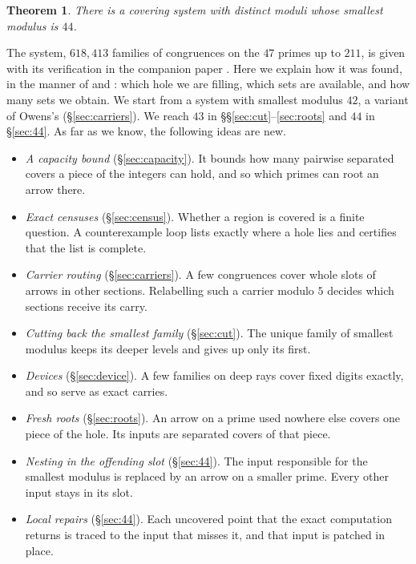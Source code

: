 \documentclass[11pt]{amsart}
\newtheorem{theorem}{Theorem}[section]
\theoremstyle{definition}
\theoremstyle{remark}
\begin{document}
\begin{theorem}\label{thm:44}
There is a covering system with distinct moduli whose smallest modulus is $44$.
\end{theorem}

The system, $618{,}413$ families of congruences on the $47$ primes up to $211$, is given with its verification in the
companion paper \cite{Companion}. Here we explain how it was found, in the manner of \cite{Nielsen09} and
\cite{Owens14}: which hole we are filling, which sets are available, and how many sets we obtain. We start from a
system with smallest modulus $42$, a variant of Owens's (§\ref{sec:carriers}). We reach $43$ in
§§\ref{sec:cut}--\ref{sec:roots} and $44$ in §\ref{sec:44}. As far as we know, the following ideas are new.
\begin{itemize}
\item \emph{A capacity bound} (§\ref{sec:capacity}). It bounds how many pairwise separated covers a piece of the
  integers can hold, and so which primes can root an arrow there.
\item \emph{Exact censuses} (§\ref{sec:census}). Whether a region is covered is a finite question. A counterexample
  loop lists exactly where a hole lies and certifies that the list is complete.
\item \emph{Carrier routing} (§\ref{sec:carriers}). A few congruences cover whole slots of arrows in other sections.
  Relabelling such a carrier modulo $5$ decides which sections receive its carry.
\item \emph{Cutting back the smallest family} (§\ref{sec:cut}). The unique family of smallest modulus keeps its deeper
  levels and gives up only its first.
\item \emph{Devices} (§\ref{sec:device}). A few families on deep rays cover fixed digits exactly, and so serve as
  exact carries.
\item \emph{Fresh roots} (§\ref{sec:roots}). An arrow on a prime used nowhere else covers one piece of the hole.
  Its inputs are separated covers of that piece.
\item \emph{Nesting in the offending slot} (§\ref{sec:44}). The input responsible for the smallest modulus is
  replaced by an arrow on a smaller prime. Every other input stays in its slot.
\item \emph{Local repairs} (§\ref{sec:44}). Each uncovered point that the exact computation returns is traced to the
  input that misses it, and that input is patched in place.
\end{itemize}
\end{document}
